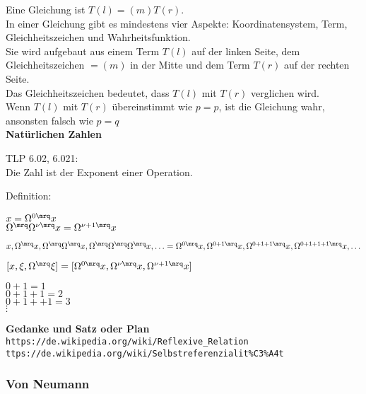 \documentclass[10pt,a4paper]{article}
\begin{document}
Eine Gleichung ist $T(l) = (m) T(r)$. \\
In einer Gleichung gibt es mindestens vier Aspekte: Koordinatensystem, Term,
Gleichheitszeichen und Wahrheitsfunktion. \\
Sie wird aufgebaut aus einem Term $T(l)$ auf der linken Seite,
dem Gleichheitszeichen $=(m)$ in der Mitte und dem Term $T(r)$ auf der rechten
Seite. \\
Das Gleichheitszeichen bedeutet, dass $T(l)$ mit $T(r)$ verglichen wird. \\
Wenn $T(l)$ mit $T(r)$ übereinstimmt wie $p = p$, ist die Gleichung wahr,
ansonsten falsch wie $p = q$ \\

{\bf Natürlichen Zahlen}
\vskip 8pt

TLP 6.02, 6.021: \\
Die Zahl ist der Exponent einer Operation.

\begin{labeling}{Definition:}
  \setlength\itemsep{-3pt}

\item[Regeln:]
  $x = \Omega^{0 \mrq}x$ \\
  $\Omega^\mrq \Omega^{\nu \mrq}x = \Omega^{\nu+1 \mrq}x$

\item[Reihe:]
  $x, \Omega^{\mrq}x, \Omega^{\mrq}\Omega^{\mrq}x, \Omega^{\mrq}\Omega^{\mrq}\Omega^{\mrq}x, \ldots =
  \Omega^{0 \mrq}x, \Omega^{0+1 \mrq}x, \Omega^{0+1+1 \mrq}x, \Omega^{0+1+1+1 \mrq}x, \ldots$

\item[Operation:]
  $[x, \xi, \Omega^{\mrq} \xi] = [\Omega^{0 \mrq}x, \Omega^{\nu \mrq}x, \Omega^{\nu+1 \mrq}x]$

\item[Definition:]
  $0 + 1 = 1$ \\
  $0 + 1 + 1 = 2$ \\
  $0 + 1 + + 1 = 3$ \\
  $\vdots$
\end{labeling}


\vskip 8pt
{\bf Gedanke und Satz oder Plan}
\\
\verb+https://de.wikipedia.org/wiki/Reflexive_Relation+ \\
\verb+ttps://de.wikipedia.org/wiki/Selbstreferenzialit%C3%A4t+ \\

\vskip 8pt
\subsubsection{Von Neumann}
\end{document}
